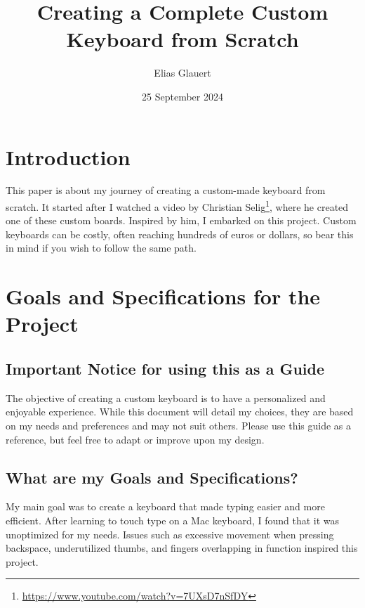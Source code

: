 \documentclass[a4paper,12pt]{article}
\title{Creating a Complete Custom Keyboard from Scratch}
\author{Elias Glauert}
\date{25 September 2024}
\begin{document}
\maketitle

\pagebreak

\tableofcontents

\pagebreak

\section{Introduction}

This paper is about my journey of creating a custom-made keyboard from scratch. It started after I watched a video by Christian Selig\footnote{\url{https://www.youtube.com/watch?v=7UXsD7nSfDY}}, where he created one of these custom boards. Inspired by him, I embarked on this project. Custom keyboards can be costly, often reaching hundreds of euros or dollars, so bear this in mind if you wish to follow the same path.

\section{Goals and Specifications for the Project}

\subsection{Important Notice for using this as a Guide}
The objective of creating a custom keyboard is to have a personalized and enjoyable experience. While this document will detail my choices, they are based on my needs and preferences and may not suit others. Please use this guide as a reference, but feel free to adapt or improve upon my design.

\subsection{What are my Goals and Specifications?}
My main goal was to create a keyboard that made typing easier and more efficient. After learning to touch type on a Mac keyboard, I found that it was unoptimized for my needs. Issues such as excessive movement when pressing backspace, underutilized thumbs, and fingers overlapping in function inspired this project. 
\end{document}
